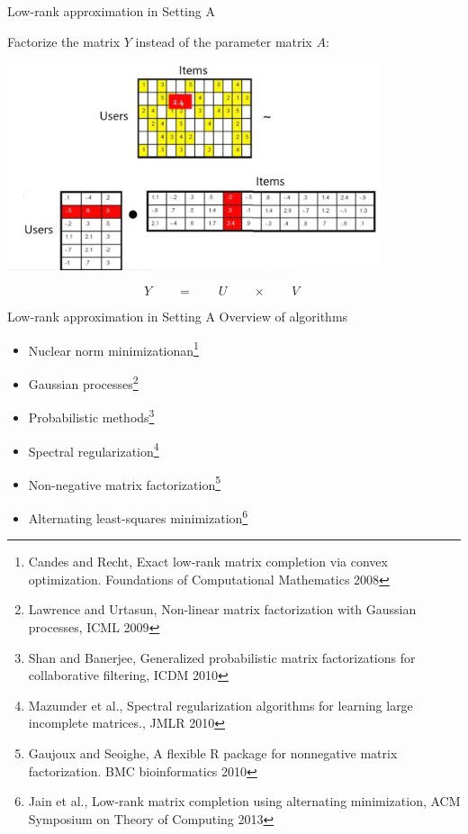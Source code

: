 \documentclass[]{beamer}
\begin{document}
\begin{frame}{Low-rank approximation in Setting A}

Factorize the matrix $Y$ instead of the parameter matrix $A$: 
\begin{center}
\includegraphics[width=11cm]{Figures/matrixcompletion2}
\end{center}
$$Y \qquad = \qquad  U \qquad \times \qquad V \qquad $$

\end{frame}

\begin{frame}{Low-rank approximation in Setting A}
{Overview of algorithms}

\begin{itemize}
\item Nuclear norm minimizationan\footnote{Candes and Recht, Exact low-rank matrix completion via convex optimization. Foundations
of Computational Mathematics 2008}
\item Gaussian processes\footnote{Lawrence and Urtasun, Non-linear matrix factorization with Gaussian processes, ICML 2009}
\item Probabilistic methods\footnote{Shan and Banerjee, Generalized probabilistic matrix factorizations for collaborative
filtering, ICDM 2010} 
\item Spectral regularization\footnote{Mazumder et al., Spectral regularization algorithms for learning large incomplete matrices., JMLR 2010} 
\item Non-negative matrix factorization\footnote{Gaujoux and Seoighe, A flexible R package for nonnegative matrix factorization.
BMC bioinformatics 2010}
\item Alternating least-squares minimization\footnote{Jain et al., Low-rank matrix completion using alternating minimization, ACM Symposium on Theory of Computing 2013}
\end{itemize}

\end{frame}
\end{document}
